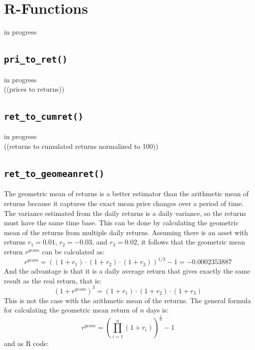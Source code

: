 \documentclass[
  oneside]{book}
\begin{document}
\hypertarget{r-functions-2}{%
\section{R-Functions}\label{r-functions-2}}

\textbar\textbar\textbar in progress\textbar\textbar\textbar{}\\

\hypertarget{pritoret}{%
\subsection{\texorpdfstring{\texttt{pri\_to\_ret()}}{pri\_to\_ret()}}\label{pritoret}}

\textbar\textbar\textbar in progress\textbar\textbar\textbar{}\\
((prices to returns))

\hypertarget{ret_to_cumret}{%
\subsection{\texorpdfstring{\texttt{ret\_to\_cumret()}}{ret\_to\_cumret()}}\label{ret_to_cumret}}

\textbar\textbar\textbar in progress\textbar\textbar\textbar{}\\
((returns to cumulated returns normalized to 100))

\hypertarget{geomeanret}{%
\subsection{\texorpdfstring{\texttt{ret\_to\_geomeanret()}}{ret\_to\_geomeanret()}}\label{geomeanret}}

The geometric mean of returns is a better estimator than the arithmetic mean of returns because it captures the exact mean price changes over a period of time. The variance estimated from the daily returns is a daily variance, so the returns must have the same time base. This can be done by calculating the geometric mean of the returns from multiple daily returns. Assuming there is an asset with returns \(r_1 = 0.01\), \(r_2=-0.03\), and \(r_3=0.02\), it follows that the geometric mean return \(r^{geom}\) can be calculated as:
\[
  r^{geom} = ((1+r_1) \cdot (1+r_2) \cdot (1+r_3))^{1/3}-1 = -0.0002353887
\]
And the advantage is that it is a daily average return that gives exactly the same result as the real return, that is:
\[
  (1+r^{geom})^3 = (1+r_1) \cdot (1+r_2) \cdot (1+r_3)
\]
This is not the case with the arithmetic mean of the returns. The general formula for calculating the geometric mean return of \(n\) days is:
\[
  r^{geom} = (\prod_{i=1}^n (1+r_i))^{\frac{1}{n}}-1
\]
and as R code:
\end{document}
